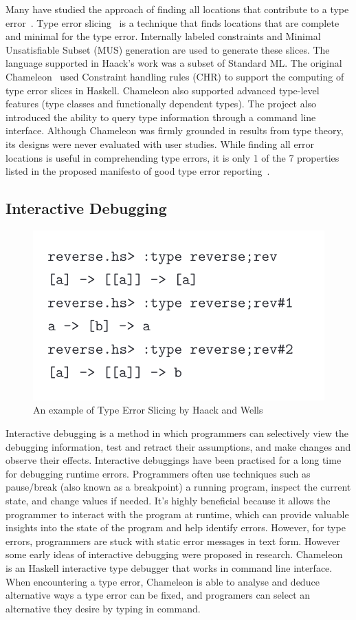 Many have studied the approach of finding all locations that contribute to a type error~\cite{Stuckey2003-pz, Haack2004-fr, Pavlinovic2015-ke, Schilling2012-iq}. Type error slicing~\cite{Haack2004-fr} is a technique that finds locations that are complete and minimal for the type error. Internally labeled constraints and Minimal Unsatisfiable Subset (MUS) generation are used to generate these slices. The language supported in Haack's work was a subset of Standard ML. The original Chameleon~\cite{Stuckey2003-pz} used  Constraint handling rules (CHR) to support the computing of type error slices in Haskell. Chameleon also supported advanced type-level features (type classes and functionally dependent types). The project also introduced the ability to query type information through a command line interface. Although Chameleon was firmly grounded in results from type theory, its designs were never evaluated with user studies. While finding all error locations is useful in comprehending type errors, it is only 1 of the 7 properties listed in the proposed manifesto of good type error reporting~\cite{Yang2000-wn}.

\subsection{Interactive Debugging}

\begin{figure}[hbt]
    \includegraphics[width=0.6\linewidth]{ChameleonInteractive}
    \caption{An example of Type Error Slicing by Haack and Wells
    }
\end{figure}
Interactive debugging is a method in which programmers can selectively view the debugging information, test and retract their assumptions, and  make changes and observe their effects. Interactive debuggings have been practised for a long time for debugging runtime errors. Programmers often use techniques such as pause/break (also known as a breakpoint) a running program, inspect the current state, and change values if needed. It's highly beneficial because it allows the programmer to interact with the program at runtime, which can provide valuable insights into the state of the program and help identify errors. However, for type errors, programmers are stuck with static error messages in text form. However some early ideas of interactive debugging were proposed in research. Chameleon is an Haskell interactive type debugger that works in command line interface. When encountering a type error, Chameleon is able to analyse and deduce alternative ways a type error can be fixed, and programers can select an alternative they desire by typing in command.


